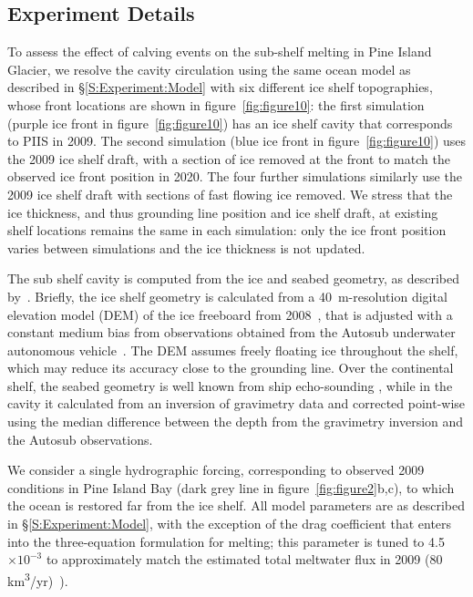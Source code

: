 \documentclass[draft]{agujournal2019}
\begin{document}
\subsection{Experiment Details}
To assess the effect of calving events on the sub-shelf melting in Pine Island Glacier, we resolve the cavity circulation using the same ocean model as described in \S\ref{S:Experiment:Model} with six different ice shelf topographies, whose front locations are shown in figure~\ref{fig:figure10}: the first simulation (purple ice front in figure~\ref{fig:figure10}) has an ice shelf cavity that corresponds to PIIS in 2009. The second simulation (blue ice front in figure~\ref{fig:figure10}) uses the 2009 ice shelf draft, with a section of ice removed at the front to match the observed ice front position in 2020. The four further simulations similarly use the 2009 ice shelf draft with sections of fast flowing ice removed. We stress that the ice thickness, and thus grounding line position and ice shelf draft, at existing shelf locations remains the same in each simulation: only the ice front position varies between simulations and the ice thickness is not updated.  %

The sub shelf cavity is computed from the ice and seabed geometry, as described by~. Briefly, the ice shelf geometry is calculated from a 40~m-resolution digital elevation model (DEM) of the ice freeboard from 2008~\cite{Korona2009Photogrammetry}, that is adjusted with a constant medium bias from observations obtained from the Autosub underwater autonomous vehicle~\cite{Jenkins2010NatureGeo}. The DEM assumes freely floating ice throughout the shelf, which may reduce its accuracy close to the grounding line. Over the continental shelf, the seabed geometry is well known from ship echo-sounding \cite{Dutrieux2014Science}, while in the cavity it calculated from an inversion of gravimetry data and corrected point-wise using the median difference between the depth from the gravimetry inversion and the Autosub observations. 

We consider a single hydrographic forcing, corresponding to observed 2009 conditions in Pine Island Bay (dark grey line in figure~\ref{fig:figure2}b,c), to which the ocean is restored far from the ice shelf. All model parameters are as described in \S\ref{S:Experiment:Model}, with the exception of the drag coefficient that enters into the three-equation formulation for melting; this parameter is tuned to 4.5$\times10^{-3}$ to approximately match the estimated total meltwater flux in 2009 (80 km\textsuperscript{3}/yr)~\cite{Dutrieux2014Science}). %
\end{document}
